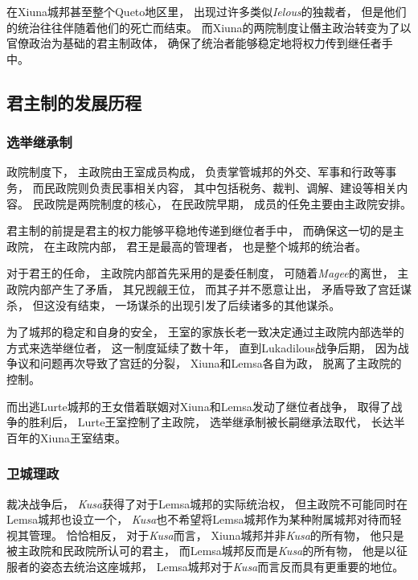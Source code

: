 \documentclass[UTF8,12pt]{ctexbook}
\begin{document}
                在Xiuna城邦甚至整个Queto地区里，
                出现过许多类似\emph{Ielous}的独裁者，
                但是他们的统治往往伴随着他们的死亡而结束。
                而Xiuna的两院制度让僭主政治转变为了以官僚政治为基础的君主制政体，
                确保了统治者能够稳定地将权力传到继任者手中。
            \subsection{君主制的发展历程}
                \subsubsection{选举继承制}
                政院制度下，
                主政院由王室成员构成，
                负责掌管城邦的外交、军事和行政等事务，
                而民政院则负责民事相关内容，
                其中包括税务、裁判、调解、建设等相关内容。
                民政院是两院制度的核心，
                在民政院早期，
                成员的任免主要由主政院安排。

                君主制的前提是君主的权力能够平稳地传递到继位者手中，
                而确保这一切的是主政院，
                在主政院内部，
                君王是最高的管理者，
                也是整个城邦的统治者。

                对于君王的任命，
                主政院内部首先采用的是委任制度，
                可随着\emph{Magee}的离世，
                主政院内部产生了矛盾，
                其兄觊觎王位，
                而其子并不愿意让出，
                矛盾导致了宫廷谋杀，
                但这没有结束，
                一场谋杀的出现引发了后续诸多的其他谋杀。

                为了城邦的稳定和自身的安全，
                王室的家族长老一致决定通过主政院内部选举的方式来选举继位者，
                这一制度延续了数十年，
                直到Lukadilous战争后期，
                因为战争议和问题再次导致了宫廷的分裂，
                Xiuna和Lemsa各自为政，
                脱离了主政院的控制。

                而出逃Lurte城邦的王女借着联姻对Xiuna和Lemsa发动了继位者战争，
                取得了战争的胜利后，
                Lurte王室控制了主政院，
                选举继承制被长嗣继承法取代，
                长达半百年的Xiuna王室结束。
                \subsubsection{卫城理政}
                裁决战争后，
                \emph{Kusa}获得了对于Lemsa城邦的实际统治权，
                但主政院不可能同时在Lemsa城邦也设立一个，
                \emph{Kusa}也不希望将Lemsa城邦作为某种附属城邦对待而轻视其管理。
                恰恰相反，
                对于\emph{Kusa}而言，
                Xiuna城邦并非\emph{Kusa}的所有物，
                他只是被主政院和民政院所认可的君主，
                而Lemsa城邦反而是\emph{Kusa}的所有物，
                他是以征服者的姿态去统治这座城邦，
                Lemsa城邦对于\emph{Kusa}而言反而具有更重要的地位。
\end{document}
